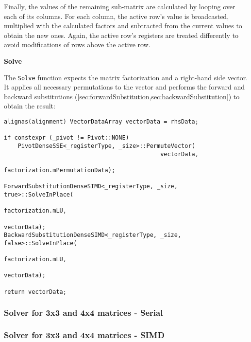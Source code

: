 Finally, the values of the remaining sub-matrix are calculated by looping over each of its columns.
For each column, the active row's value is broadcasted, multiplied with the calculated factors and subtracted from the current values to obtain the new ones.
Again, the active row's registers are treated differently to avoid modifications of rows above the active row.





\vspace{1cm}
\textbf{Solve}
\vspace{0.5cm}

The \texttt{Solve} function expects the matrix factorization and a right-hand side vector.
It applies all necessary permutations to the vector and performs the forward and backward substitutions (\cref{sec:forwardSubstitution,sec:backwardSubstitution}) to obtain the result:

\begin{verbatim}
alignas(alignment) VectorDataArray vectorData = rhsData;

if constexpr (_pivot != Pivot::NONE)
    PivotDenseSSE<_registerType, _size>::PermuteVector(
                                             vectorData, 
                                             factorization.mPermutationData);

ForwardSubstitutionDenseSIMD<_registerType, _size, true>::SolveInPlace(
                                                              factorization.mLU, 
                                                              vectorData);
BackwardSubstitutionDenseSIMD<_registerType, _size, false>::SolveInPlace(
                                                                factorization.mLU, 
                                                                vectorData);

return vectorData;
\end{verbatim}


\newpage
\subsubsection{Solver for 3x3 and 4x4 matrices - Serial}
\subsubsection{Solver for 3x3 and 4x4 matrices - SIMD}